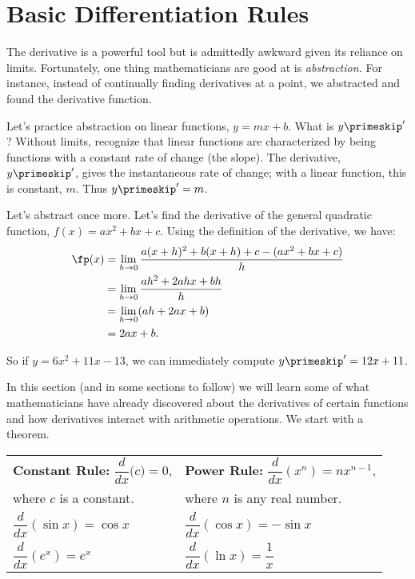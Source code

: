 \section{Basic Differentiation Rules}\label{sec:basic_diff_rules}

The derivative is a powerful tool but is admittedly awkward given its reliance on limits. Fortunately, one thing mathematicians are good at is \emph{abstraction.} For instance, instead of continually finding derivatives at a point, we abstracted and found the derivative function. 

Let's practice abstraction on linear functions, $y=mx+b$. What is $y\primeskip'$? Without limits, recognize that linear functions are characterized by being functions with a constant rate of change (the slope). The derivative, $y\primeskip'$, gives the instantaneous rate of change; with a linear function, this is constant, $m$. Thus $y\primeskip'=m$. 

Let's abstract once more. Let's find the derivative of the general quadratic function, $f(x) = ax^2+bx+c$. Using the definition of the derivative, we have:
\begin{align*}
	\fp(x)
	&=	\lim_{h\to 0}\frac{a(x+h)^2+b(x+h)+c-(ax^2+bx+c)}{h} \\
	&=	\lim_{h\to 0} \frac{ah^2+2ahx+bh}{h} \\
	&=	\lim_{h\to 0}(ah+2ax+b)\\
	&= 2ax+b.
\end{align*}
		
So if $y = 6x^2+11x-13$, we can immediately compute $y\primeskip' = 12x+11$.\bigskip

In this section (and in some sections to follow) we will learn some of what mathematicians have already discovered about the derivatives of certain functions and how derivatives interact with arithmetic operations. We start with a theorem.

\begin{anywhereenum}
\begin{theorem}\label{thm:deriv_common}
\noindent{}%
\begin{tabular}{ll}
\item \textbf{Constant Rule:}	$\dfrac d{dx}\bigl( c\bigr) = 0$, &
\item \textbf{Power Rule:} $\dfrac d{dx}\left(x^n\right) = nx^{n-1}$,\\
\null\qquad where $c$ is a constant. &
\null\qquad where $n$ is any real number.\\
\item $\dfrac d{dx}(\sin x) = \cos x$ &
\item $\dfrac d{dx}(\cos x) = -\sin x$ \\[2ex]
\item $\dfrac d{dx}\left(e^x\right) = e^x$ &
\item $\dfrac d{dx}(\ln x) = \dfrac1x$
\end{tabular}
\end{theorem}
\end{anywhereenum}

